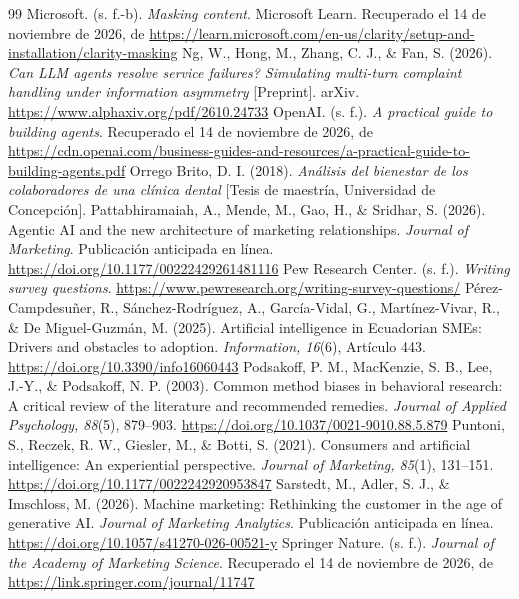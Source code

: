 \documentclass[12pt,letterpaper]{article}
\begin{document}
\begin{thebibliography}{99}
 Microsoft. (s. f.-b). \emph{Masking content}. Microsoft Learn. Recuperado el 14 de noviembre de 2026, de \url{https://learn.microsoft.com/en-us/clarity/setup-and-installation/clarity-masking}
 Ng, W., Hong, M., Zhang, C. J., \& Fan, S. (2026). \emph{Can LLM agents resolve service failures? Simulating multi-turn complaint handling under information asymmetry} [Preprint]. arXiv. \url{https://www.alphaxiv.org/pdf/2610.24733}
 OpenAI. (s. f.). \emph{A practical guide to building agents}. Recuperado el 14 de noviembre de 2026, de \url{https://cdn.openai.com/business-guides-and-resources/a-practical-guide-to-building-agents.pdf}
 Orrego Brito, D. I. (2018). \emph{Análisis del bienestar de los colaboradores de una clínica dental} [Tesis de maestría, Universidad de Concepción].
 Pattabhiramaiah, A., Mende, M., Gao, H., \& Sridhar, S. (2026). Agentic AI and the new architecture of marketing relationships. \emph{Journal of Marketing}. Publicación anticipada en línea. \url{https://doi.org/10.1177/00222429261481116}
 Pew Research Center. (s. f.). \emph{Writing survey questions}. \url{https://www.pewresearch.org/writing-survey-questions/}
 Pérez-Campdesuñer, R., Sánchez-Rodríguez, A., García-Vidal, G., Martínez-Vivar, R., \& De Miguel-Guzmán, M. (2025). Artificial intelligence in Ecuadorian SMEs: Drivers and obstacles to adoption. \emph{Information, 16}(6), Artículo 443. \url{https://doi.org/10.3390/info16060443}
 Podsakoff, P. M., MacKenzie, S. B., Lee, J.-Y., \& Podsakoff, N. P. (2003). Common method biases in behavioral research: A critical review of the literature and recommended remedies. \emph{Journal of Applied Psychology, 88}(5), 879--903. \url{https://doi.org/10.1037/0021-9010.88.5.879}
 Puntoni, S., Reczek, R. W., Giesler, M., \& Botti, S. (2021). Consumers and artificial intelligence: An experiential perspective. \emph{Journal of Marketing, 85}(1), 131--151. \url{https://doi.org/10.1177/0022242920953847}
 Sarstedt, M., Adler, S. J., \& Imschloss, M. (2026). Machine marketing: Rethinking the customer in the age of generative AI. \emph{Journal of Marketing Analytics}. Publicación anticipada en línea. \url{https://doi.org/10.1057/s41270-026-00521-y}
 Springer Nature. (s. f.). \emph{Journal of the Academy of Marketing Science}. Recuperado el 14 de noviembre de 2026, de \url{https://link.springer.com/journal/11747}

\end{thebibliography}
\end{document}
